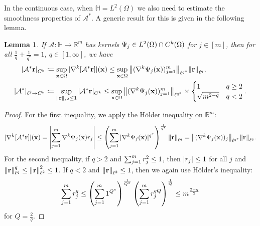 \documentclass[10pt,a4paper,onecolumn]{article} \usepackage[latin1]{inputenc}
\numberwithin{equation}{section}
\newtheorem{lemma}{Lemma}[section]\newtheorem{example}{Example}[section]
\let\F\mathds\let\C\mathcal\newcommand{\R}{\F{R}}\newcommand{\A}{\C{A}}
\newcommand{\norm}[1]{{\left\lVert #1 \right\rVert}}
\newcommand{\splitln}[4]{\begin{cases} #1 & #2 \\ #3 & #4\end{cases}}
\renewcommand{\vec}{\mathbf}
\newcommand{\UCmath}[1]{%
	\begingroup
	\ucmathlist\uppercase\expandafter{#1}%
	\endgroup
}
\newcommand{\ucmathlist}{%
	\def\alpha{\mathrm{A}}%
	\def\beta{\mathrm{B}}%
	\let\gamma=\Gamma
	\let\delta=\Delta
	\def\epsilon{\mathrm{E}}%
	\def\varepsilon{\mathrm{E}}%
	\def\zeta{\mathrm{Z}}%
	\def\eta{\mathrm{H}}%
	\let\theta=\Theta
	\let\vartheta=\Theta
	\def\iota{\mathrm{I}}%
	\def\kappa{\mathrm{K}}%
	\let\lambda=\Lambda
	\def\mu{\mathrm{M}}%
	\def\nu{\mathrm{N}}%
	\let\xi=\Xi
	\let\pi=\Pi
	\let\varpi=\Pi
	\def\rho{\mathrm{P}}%
	\def\varrho{\mathrm{P}}%
	\let\sigma=\Sigma
	\def\tau{\mathrm{T}}%
	\let\upsilon=\Upsilon
	\let\phi=\Phi
	\let\varphi=\Phi
	\def\chi{\mathrm{X}}%
	\let\psi=\Psi
	\let\omega=\Omega
}
\newcommand{\caps}[1]{\UCmath{#1}}
\newcommand*{\vard}[1]{%
	\IfEqCase{#1}{%
		{0}{\varphi}%
		{1}{\psi}%
	}[\varphi #1]%
}
\newcommand*{\varx}[1]{%
	\IfEqCase{#1}{%
		{0}{x}%
		{1}{y}%
		{2}{z}%
		{3}{r}%
	}[x#1]%
}
\newcommand{\Domain}{\Omega}
\newcommand*{\Varx}[1]{\caps{\varx{#1}}}
\newcommand*{\vvarx}[1]{\vec{\varx{#1}}}\newcommand*{\vVarx}[1]{\vec{\Varx{#1}}}
\begin{document}
In the continuous case, when $\F H=L^2(\Domain)$ we also need to estimate the smoothness properties of $\A^*$. A generic result for this is given in the following lemma.
\begin{lemma}\label{thm:ca: norm bound smoothness}
	If $\A\colon \F H \to \R^m$ has kernels $\vard1_j\in L^2(\Domain)\cap C^k(\Domain)$ for $j\in[m]$, then for all $\frac1q+\frac1{q^*}=1$, $q\in[1,\infty]$, we have
	\begin{align*}
		|\A^*\vvarx3|_{C^k}&\coloneqq \sup_{\vvarx0\in\Domain} |\nabla^k[\A^*\vvarx3]|(\vvarx0) \leq \sup_{\vvarx0\in\Domain}\norm{(\nabla^k\vard1_j(\vvarx0))_{j=1}^m}_{\ell^{q^*}}\norm{\vvarx3}_{\ell^q},
		\\ |\A^*|_{\ell^2\to C^k}&\coloneqq \sup_{\norm{\vvarx3}_{\ell^2}\leq 1} |\A^*\vvarx3|_{C^k} \leq \sup_{\vvarx0\in\Domain}\norm{(\nabla^k\vard1_j(\vvarx0))_{j=1}^m}_{\ell^{q^*}}\times \splitln{1}{q\geq 2}{\sqrt{m^{2-q}}}{q<2}.
	\end{align*}
\end{lemma}
\begin{proof}
	For the first inequality, we apply the H\"older inequality on $\R^m$:
	$$ |\nabla^k[\A^*\vvarx3]|(\vvarx0) = \left|\sum_{j=1}^m\nabla^k\vard1_j(\vvarx0)\varx3_j\right|
	\leq \left(\sum_{j=1}^m|\nabla^k\vard1_j(\vvarx0)|^{q^*}\right)^{\frac{1}{q^*}}\norm{\vvarx3}_{\ell^q} = \norm{(\nabla^k\vard1_j(\vvarx0))_j}_{\ell^{q^*}}\norm{\vvarx3}_{\ell^q}.$$
	For the second inequality, if $q>2$ and $\sum_{j=1}^m \varx3_j^2\leq 1$, then $|\varx3_j|\leq 1$ for all $j$ and $\norm{\vvarx3}_{\ell^q}^q\leq \norm{\vvarx3}_{\ell^2}^2\leq 1$. If $q<2$ and $\norm{\vvarx3}_{\ell^2}\leq 1$, then we again use H\"older's inequality:
	$$\sum_{j=1}^m \varx3_j^q \leq \left(\sum_{j=1}^m 1^{Q^*}\right)^{\frac1{Q^*}} \left(\sum_{j=1}^m \varx3_j^{qQ}\right)^{\frac1{Q}} \leq m^{\frac{2-q}{2}}$$
	for $Q = \frac2q$.
\end{proof}
\end{document}
